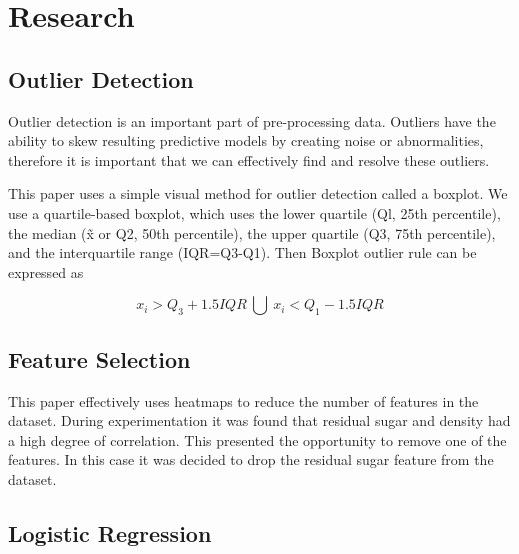 \section{Research}

\subsection{Outlier Detection}

Outlier detection is an important part of pre-processing data. Outliers have the ability to skew resulting predictive models by creating noise or abnormalities, therefore it is important that we can effectively find and resolve these outliers.

This paper uses a simple visual method for outlier detection called a boxplot.
We use a quartile-based boxplot, which uses the lower quartile (Ql, 25th percentile), the median (x̃  or Q2, 50th percentile), the upper quartile (Q3, 75th percentile), and the interquartile range (IQR=Q3-Q1). Then Boxplot outlier rule can be expressed as\cite{6520712}

\begin{equation}
x_{i} > Q_{3}+1.5IQR\ \bigcup \ x_{i} < Q_{1}-1.5IQR
\end{equation}

\subsection{Feature Selection}

This paper effectively uses heatmaps to reduce the number of features in the dataset. During experimentation it was found that residual sugar and density had a high degree of correlation. This presented the opportunity to remove one of the features. In this case it was decided to drop the residual sugar feature from the dataset.

\subsection{Logistic Regression}

